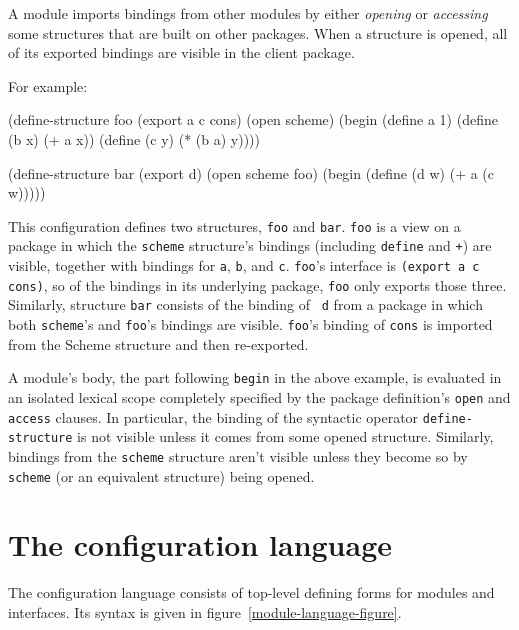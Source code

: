 A module imports bindings from other modules by either {\em opening}
or {\em accessing} some structures that are built on other packages.
When a structure is opened, all of its exported bindings are visible
in the client package.

For example:
\begin{example}
(define-structure foo (export a c cons)
  (open scheme)
  (begin (define a 1)
         (define (b x) (+ a x))
         (define (c y) (* (b a) y))))

(define-structure bar (export d)
  (open scheme foo)
  (begin (define (d w) (+ a (c w)))))
\end{example}
This configuration defines two structures, {\tt foo} and {\tt bar}.
{\tt foo} is a view on a package in which the {\tt scheme} structure's
bindings (including {\tt define} and {\tt +}) are visible, together
with bindings for {\tt a}, {\tt b},
and {\tt c}.  {\tt foo}'s interface is {\tt (export a c cons)}, so of
the bindings in its underlying package, {\tt foo} only exports those
three.  Similarly, structure {\tt bar} consists of the binding of {\tt
d} from a package in which both {\tt scheme}'s and {\tt foo}'s
bindings are visible.  {\tt foo}'s binding of {\tt cons} is imported
from the Scheme structure and then re-exported.

A module's body, the part following {\tt begin} in the above example,
is evaluated in an isolated lexical scope completely specified by the
package definition's {\tt open} and {\tt access} clauses.  In
particular, the binding of the syntactic operator {\tt define-structure}
is not visible unless it comes from some opened structure.  Similarly,
bindings from the {\tt scheme} structure aren't visible unless they
become so by {\tt scheme} (or an equivalent structure) being opened.


\section{The configuration language}

The configuration language consists of top-level defining forms for
 modules and interfaces.
Its syntax is given in figure~\ref{module-language-figure}.

\texonly{}\hbox{\goesto}\endtexonly
\texonly\newcommand{\altz}{\hbox to 1\wd0{\hfil\alt}}\endtexonly
\htmlonly\newcommand{\altz}{\goesto}\endhtmlonly

